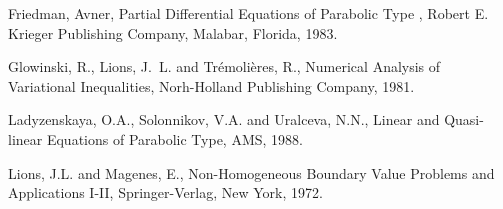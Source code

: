 \documentclass[10pt]{ijnam}
\begin{document}
\begin{thebibliography}{99}

 Friedman, Avner,
Partial Differential Equations of Parabolic Type , Robert E. Krieger
Publishing Company, Malabar, Florida, 1983.

 Glowinski, R., Lions, J.~L. and Tr\'{e}moli\`{e}res, R.,
Numerical Analysis of Variational Inequalities, Norh-Holland Publishing
Company, 1981.

 Ladyzenskaya, O.A., Solonnikov, V.A. and Uralceva, N.N.,
Linear and Quasi-linear Equations of Parabolic Type, AMS, 1988.

 Lions, J.L. and Magenes, E.,
Non-Homogeneous Boundary Value Problems and Applications I-II,
Springer-Verlag, New York, 1972.

\end{thebibliography}
\end{document}
